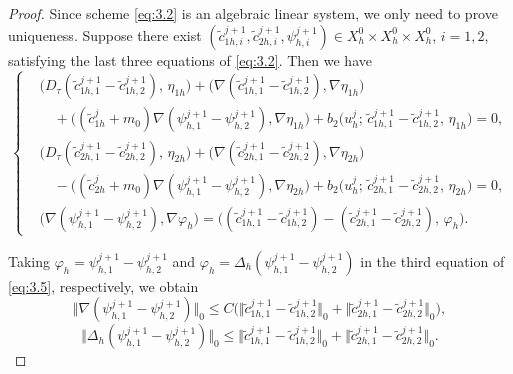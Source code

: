\documentclass[a4paper,fleqn]{cas-sc}
\numberwithin{equation}{section}
\theoremstyle{definition}
\begin{document}
\begin{proof}
Since scheme \eqref{eq:3.2} is an algebraic linear system, we only need
to prove uniqueness. Suppose there exist
$(\tilde{c}^{j+1}_{1h,i},\tilde{c}^{j+1}_{2h,i},\psi^{j+1}_{h,i})
\in X^{0}_{h}\times X^{0}_{h}\times X^{0}_{h}$, $i=1,2$, satisfying the
last three equations of \eqref{eq:3.2}. Then we have
\begin{equation}
  \left\{
  \begin{aligned}
    &\bigl(D_{\tau}(\tilde{c}^{j+1}_{1h,1}-\tilde{c}^{j+1}_{1h,2}),\,\eta_{1h}\bigr)
     + \bigl(\nabla(\tilde{c}^{j+1}_{1h,1}-\tilde{c}^{j+1}_{1h,2}),\nabla\eta_{1h}\bigr)\\
    &\quad
     + \bigl((\tilde{c}^{j}_{1h}+m_{0})
       \nabla(\psi^{j+1}_{h,1}-\psi^{j+1}_{h,2}),\nabla\eta_{1h}\bigr)
     + b_{2}\bigl(u^{j}_{h};\,
       \tilde{c}^{j+1}_{1h,1}-\tilde{c}^{j+1}_{1h,2},\,\eta_{1h}\bigr) = 0,\\[4pt]
    &\bigl(D_{\tau}(\tilde{c}^{j+1}_{2h,1}-\tilde{c}^{j+1}_{2h,2}),\,\eta_{2h}\bigr)
     + \bigl(\nabla(\tilde{c}^{j+1}_{2h,1}-\tilde{c}^{j+1}_{2h,2}),\nabla\eta_{2h}\bigr)\\
    &\quad
     - \bigl((\tilde{c}^{j}_{2h}+m_{0})
       \nabla(\psi^{j+1}_{h,1}-\psi^{j+1}_{h,2}),\nabla\eta_{2h}\bigr)
     + b_{2}\bigl(u^{j}_{h};\,
       \tilde{c}^{j+1}_{2h,1}-\tilde{c}^{j+1}_{2h,2},\,\eta_{2h}\bigr) = 0,\\[4pt]
    &\bigl(\nabla(\psi^{j+1}_{h,1}-\psi^{j+1}_{h,2}),\nabla\varphi_{h}\bigr)
     = \bigl((\tilde{c}^{j+1}_{1h,1}-\tilde{c}^{j+1}_{1h,2})
       - (\tilde{c}^{j+1}_{2h,1}-\tilde{c}^{j+1}_{2h,2}),\,\varphi_{h}\bigr).
  \end{aligned}
  \right.
  \label{eq:3.5}
\end{equation}

Taking $\varphi_{h}=\psi^{j+1}_{h,1}-\psi^{j+1}_{h,2}$ and
$\varphi_{h}=\Delta_{h}(\psi^{j+1}_{h,1}-\psi^{j+1}_{h,2})$ in the third
equation of \eqref{eq:3.5}, respectively, we obtain
\begin{equation}
  \bigl\Vert\nabla(\psi^{j+1}_{h,1}-\psi^{j+1}_{h,2})\bigr\Vert_{0}
  \le C\bigl(\bigl\Vert\tilde{c}^{j+1}_{1h,1}-\tilde{c}^{j+1}_{1h,2}\bigr\Vert_{0}
           + \bigl\Vert\tilde{c}^{j+1}_{2h,1}-\tilde{c}^{j+1}_{2h,2}\bigr\Vert_{0}\bigr),
  \label{eq:3.6}
\end{equation}
\begin{equation}
  \bigl\Vert\Delta_{h}(\psi^{j+1}_{h,1}-\psi^{j+1}_{h,2})\bigr\Vert_{0}
  \le \bigl\Vert\tilde{c}^{j+1}_{1h,1}-\tilde{c}^{j+1}_{1h,2}\bigr\Vert_{0}
    + \bigl\Vert\tilde{c}^{j+1}_{2h,1}-\tilde{c}^{j+1}_{2h,2}\bigr\Vert_{0}.
  \label{eq:3.7}
\end{equation}


\end{proof}
\end{document}
